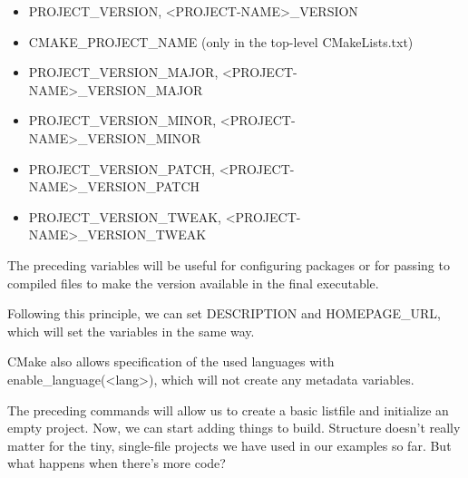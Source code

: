 \begin{itemize}
\item 
PROJECT\_VERSION, <PROJECT-NAME>\_VERSION

\item 
CMAKE\_PROJECT\_NAME (only in the top-level CMakeLists.txt)

\item 
PROJECT\_VERSION\_MAJOR, <PROJECT-NAME>\_VERSION\_MAJOR

\item 
PROJECT\_VERSION\_MINOR, <PROJECT-NAME>\_VERSION\_MINOR

\item 
PROJECT\_VERSION\_PATCH, <PROJECT-NAME>\_VERSION\_PATCH

\item 
PROJECT\_VERSION\_TWEAK, <PROJECT-NAME>\_VERSION\_TWEAK
\end{itemize}


The preceding variables will be useful for configuring packages or for passing to compiled files to make the version available in the final executable.

Following this principle, we can set DESCRIPTION and HOMEPAGE\_URL, which will set the variables in the same way.

CMake also allows specification of the used languages with enable\_language(<lang>), which will not create any metadata variables.

The preceding commands will allow us to create a basic listfile and initialize an empty project. Now, we can start adding things to build. Structure doesn't really matter for the tiny, single-file projects we have used in our examples so far. But what happens when there's more code?



